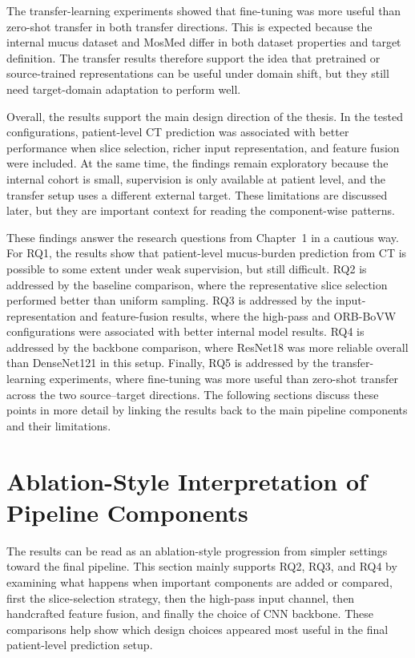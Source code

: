 The transfer-learning experiments showed that fine-tuning was more useful than zero-shot transfer in both transfer directions. This is expected because the internal mucus dataset and MosMed differ in both dataset properties and target definition. The transfer results therefore support the idea that pretrained or source-trained representations can be useful under domain shift, but they still need target-domain adaptation to perform well.

Overall, the results support the main design direction of the thesis. In the tested configurations, patient-level CT prediction was associated with better performance when slice selection, richer input representation, and feature fusion were included. At the same time, the findings remain exploratory because the internal cohort is small, supervision is only available at patient level, and the transfer setup uses a different external target. These limitations are discussed later, but they are important context for reading the component-wise patterns.

These findings answer the research questions from Chapter~1 in a cautious way. For RQ1, the results show that patient-level mucus-burden prediction from CT is possible to some extent under weak supervision, but still difficult. RQ2 is addressed by the baseline comparison, where the representative slice selection performed better than uniform sampling. RQ3 is addressed by the input-representation and feature-fusion results, where the high-pass and ORB-BoVW configurations were associated with better internal model results. RQ4 is addressed by the backbone comparison, where ResNet18 was more reliable overall than DenseNet121 in this setup. Finally, RQ5 is addressed by the transfer-learning experiments, where fine-tuning was more useful than zero-shot transfer across the two source--target directions. The following sections discuss these points in more detail by linking the results back to the main pipeline components and their limitations.


\section{Ablation-Style Interpretation of Pipeline Components}
The results can be read as an ablation-style progression from simpler settings toward the final pipeline. This section mainly supports RQ2, RQ3, and RQ4 by examining what happens when important components are added or compared, first the slice-selection strategy, then the high-pass input channel, then handcrafted feature fusion, and finally the choice of CNN backbone. These comparisons help show which design choices appeared most useful in the final patient-level prediction setup.

